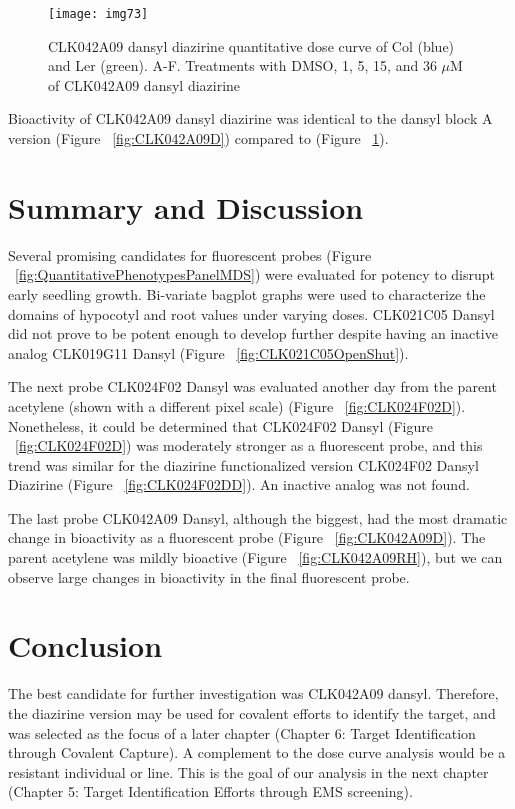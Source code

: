 \begin{figure}
\centering
\texttt{[image: img73]}
\caption{CLK042A09 dansyl diazirine quantitative dose curve of Col (blue) and Ler (green). A-F. Treatments with DMSO, 1, 5, 15, and 36 $\mu$M of CLK042A09 dansyl diazirine}
\label{fig:CLK042A09DD}
\end{figure}

Bioactivity of CLK042A09 dansyl diazirine was identical to the dansyl block A version (Figure ~\ref{fig:CLK042A09D}) compared to (Figure ~\ref{fig:CLK042A09DD}).

\section{Summary and Discussion}

Several promising candidates for fluorescent probes (Figure ~\ref{fig:QuantitativePhenotypesPanelMDS}) were evaluated for potency to disrupt early seedling growth. Bi-variate bagplot graphs were used to characterize the domains of hypocotyl and root values under varying doses. CLK021C05 Dansyl did not prove to be potent enough to develop further despite having an inactive analog CLK019G11 Dansyl (Figure ~\ref{fig:CLK021C05OpenShut}). 

The next probe CLK024F02 Dansyl was evaluated another day from the parent acetylene (shown with a different pixel scale) (Figure ~\ref{fig:CLK024F02D}). Nonetheless, it could be determined that CLK024F02 Dansyl (Figure ~\ref{fig:CLK024F02D}) was moderately stronger as a fluorescent probe, and this trend was similar for the diazirine functionalized version CLK024F02 Dansyl Diazirine (Figure ~\ref{fig:CLK024F02DD}). An inactive analog was not found. 

The last probe CLK042A09 Dansyl, although the biggest, had the most dramatic change in bioactivity as a fluorescent probe (Figure ~\ref{fig:CLK042A09D}). The parent acetylene was mildly bioactive (Figure ~\ref{fig:CLK042A09RH}), but we can observe large changes in bioactivity in the final fluorescent probe.


\section{Conclusion}

The best candidate for further investigation was CLK042A09 dansyl. Therefore, the diazirine version may be used for covalent efforts to identify the target, and was selected as the focus of a later chapter (Chapter 6: Target Identification through Covalent Capture). A complement to the dose curve analysis would be a resistant individual or line. This is the goal of our analysis in the next chapter (Chapter 5: Target Identification Efforts through EMS screening).



